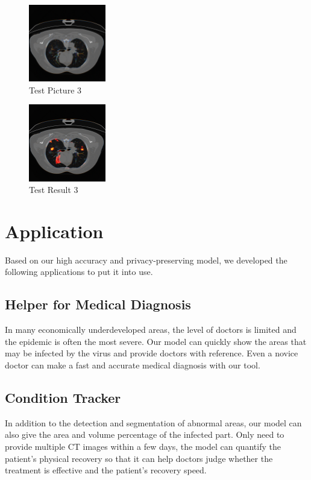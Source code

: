 \documentclass[12pt]{spie}
\begin{document}
\begin{figure}[H]
  \centering
  \includegraphics[width=0.3\textwidth]{ct01-3.png} 
   \caption{Test Picture 3}
\end{figure}
\begin{figure}[H]
  \centering
  \includegraphics[width=0.3\textwidth]{P1-3.png} 
   \caption{Test Result 3}
\end{figure}

\section{Application}
Based on our high accuracy and privacy-preserving model, we developed the following applications to put it into use.
\subsection{Helper for Medical Diagnosis}
In many economically underdeveloped areas, the level of doctors is limited and the epidemic is often the most severe. Our model can quickly show the areas that may be infected by the virus and provide doctors with reference. Even a novice doctor can make a fast and accurate medical diagnosis with our tool.
\subsection{Condition Tracker}
In addition to the detection and segmentation of abnormal areas, our model can also give the area and volume percentage of the infected part. Only need to provide multiple CT images within a few days, the model can quantify the patient's physical recovery so that it can help doctors judge whether the treatment is effective and the patient's recovery speed.
\end{document}
